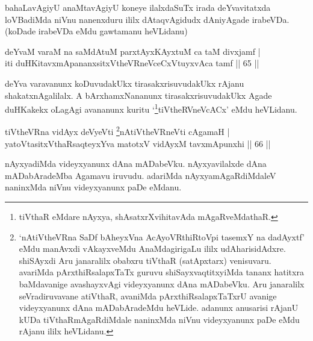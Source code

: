 \begin{artha}
bahaLavAgiyU anaMtavAgiyU koneye ilalxdaSuTx irada deYvavitatxda loVBadiMda niVnu nanenxduru ililx dAtaqvAgidudx dAniyAgade irabeVDa. (koDade irabeVDa eMdu gawtamanu heVLidanu)
\end{artha}


\begin{shl}
deYvaM varaM na saMdAtuM parxtAyxKAyxtuM ca taM divxjamf | \\
iti duHKitavxmApananxsitxVtheVRneVceCxVtuyxvAca tamf \hfill|| 65 || 
\end{shl}

\begin{artha}
deYva varavanunx koDuvudakUkx tirasakxrisuvudakUkx rAjanu 
shakatxnAgalilalx. A bArxhamxNananunx tirasakxrisuvudakUkx Agade 
duHKakekx oLagAgi avananunx kuritu `\footnote{tiVthaR eMdare 
nAyxya, shAsatxrXvihitavAda mAgaRveMdathaR.}tiVtheRVneVcACx' eMdu heVLidanu.
\end{artha}



\begin{shl}
tiVtheVRna vidAyx deVyeVti \footnote{`nAtiVtheVRna SaDf bAheyxVna AcAyoVR\s thiRtoV\s pi tasemxY na dadAyxtf' eMdu manAvxdi vAkayxveMdu AnaMdagirigaLu ililx udAharisidAdxre. shiSAyxdi Aru janaralilx obabxru tiVthaR (satApxtarx) venisuvaru. avariMda pArxthiRsalapxTaTx guruvu shiSayxvaqtitxyiMda tananx hatitxra baMdavanige avashayxvAgi videyxyanunx dAna mADabeVku. Aru janaralilx seVradiruvavane atiVthaR, avaniMda pArxthiRsalapxTaTxrU avanige videyxyanunx dAna mADabAradeMdu heVLide. adanunx anusarisi rAjanU kUDa tiVthaRmAgaRdiMdale naninxMda niVnu videyxyanunx paDe eMdu rAjanu ililx heVLidanu.}nAtiVtheVRneVti cA\s \s gamaH | \\
yatoV\s tasitxVthaRsaqteyxYva matotxV vidAyxM tavxmApunxhi \hfill|| 66 || 
\end{shl}

\begin{artha}
nAyxyadiMda videyxyanunx dAna mADabeVku. nAyxyavilalxde dAna mADabAradeMba Agamavu iruvudu. adariMda nAyxyamAgaRdiMdaleV naninxMda niVnu videyxyanunx paDe eMdanu.
\end{artha}


